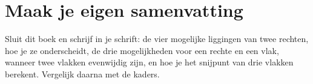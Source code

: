 \begin{oefeningen}






\end{oefeningen}


\ifzelfstudie
\section*{Maak je eigen samenvatting}
Sluit dit boek en schrijf in je schrift: de vier mogelijke liggingen van twee rechten, hoe je ze onderscheidt, de drie mogelijkheden voor een rechte en een vlak, wanneer twee vlakken evenwijdig zijn, en hoe je het snijpunt van drie vlakken berekent. Vergelijk daarna met de kaders.
\fi
